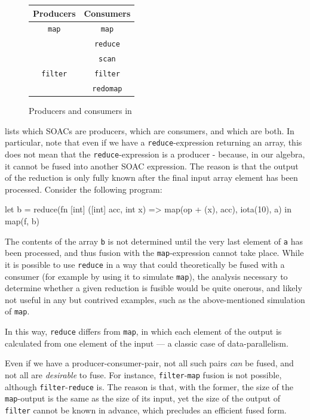 \begin{figure}
  \begin{center}
    \begin{tabular}{c|c}
      \textbf{Producers} & \textbf{Consumers} \\\hline
      \texttt{map} & \texttt{map} \\\hline
      & \texttt{reduce} \\\hline
      & \texttt{scan} \\\hline
      \texttt{filter} & \texttt{filter} \\\hline
      & \texttt{redomap} \\\hline
    \end{tabular}
  \end{center}
  \caption{Producers and consumers in \LO}
  \label{fig:producers-consumers}
\end{figure}

 lists which \LO{} SOACs are producers,
which are consumers, and which are both.  In particular, note that
even if we have a \texttt{reduce}-expression returning an array, this
does not mean that the \texttt{reduce}-expression is a producer -
because, in our algebra, it cannot be fused into another SOAC
expression.  The reason is that the output of the reduction is only
fully known after the final input array element has been processed.
Consider the following program:

\begin{colorcode}
let b = reduce(fn [int] ([int] acc, int x) =>
                 map(op + (x), acc),
               iota(10), a) in
map(f, b)
\end{colorcode}

The contents of the array \texttt{b} is not determined until the very
last element of \texttt{a} has been processed, and thus fusion with
the \texttt{map}-expression cannot take place.  While it is possible
to use \texttt{reduce} in a way that could theoretically be fused with
a consumer (for example by using it to simulate \texttt{map}), the
analysis necessary to determine whether a given reduction is fusible
would be quite onerous, and likely not useful in any but contrived
examples, such as the above-mentioned simulation of \texttt{map}.

In this way, \texttt{reduce} differs from \texttt{map}, in which each
element of the output is calculated from one element of the input ---
a classic case of data-parallelism.

Even if we have a producer-consumer-pair, not all such pairs
\textit{can} be fused, and not all are \textit{desirable} to fuse.
For instance, \texttt{filter}-\texttt{map} fusion is not possible,
although \texttt{filter}-\texttt{reduce} is.  The reason is that, with
the former, the size of the \texttt{map}-output is the same as the
size of its input, yet the size of the output of \texttt{filter}
cannot be known in advance, which precludes an efficient fused form.

